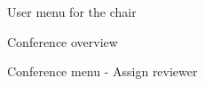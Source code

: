 \documentclass[nochapterpage,nopartpage,noheadingspace,numbersubsubsec,bigchapter,colorback,accentcolor=tud9c,10pt]{tudreport}
\begin{document}
        \begin{figure}
            \centering
            \caption{User menu for the chair}
            \label{fig:user-menu-chair}
        \end{figure}

        \begin{figure}
            \centering
            \caption{Conference overview}
            \label{fig:conference-overview}
        \end{figure}

        \begin{figure}
            \centering
            \caption{Conference menu - Assign reviewer}
            \label{fig:conference-menu2}
        \end{figure}
\end{document}
